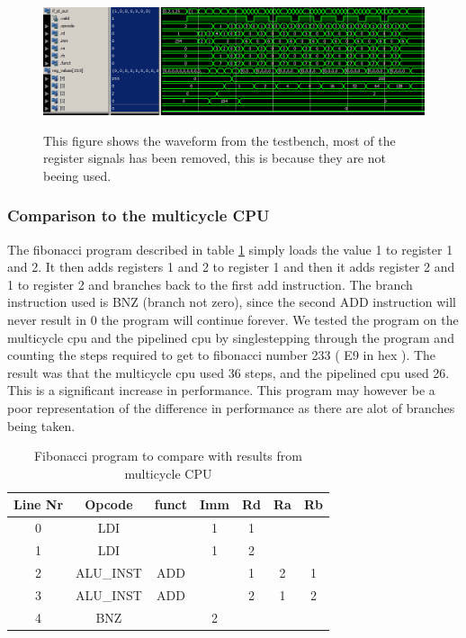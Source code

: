 \documentclass[11pt]{report}
\begin{document}
\begin{figure}
  \centering
  \includegraphics[width=.95\linewidth]{test3.png} \\
  \caption{This figure shows the waveform from the testbench, 
  most of the register signals has been removed, this is because they are not beeing used.}
  \label{fig:program3wave}
\end{figure}

\subsubsection*{Comparison to the multicycle CPU}

The fibonacci program described in table \ref{tab:fibonacci} simply loads the value 1
to register 1 and 2. It then adds registers 1 and 2 to register 1 and then it adds
register 2 and 1 to register 2 and branches back to the first add instruction. The 
branch instruction used is BNZ (branch not zero), since the second ADD instruction
will never result in 0 the program will continue forever. We tested the program on
the multicycle cpu and the pipelined cpu by singlestepping through the program and
counting the steps required to get to fibonacci number 233 ( E9 in hex ). The result
was that the multicycle cpu used 36 steps, and the pipelined cpu used 26. This is a
significant increase in performance. This program may however be a poor representation
of the difference in performance as there are alot of branches being taken.

\begin{table}[htbp]
  \centering
  \begin{tabular}{|c|c|c|c|c|c|c|}
    \hline
    Line Nr &	Opcode		&	funct	&	Imm	&	Rd	&	Ra	&	Rb	\\\hline
    	0	&	LDI			&			&	1	&	1	&		&		\\\hline
    	1	&	LDI			&			&	1	&	2	&		&		\\\hline
    	2	&	ALU\_INST	&	ADD		&		&	1	&	2	&	1	\\\hline
    	3	&	ALU\_INST	&	ADD		&		&	2	&	1	&	2	\\\hline
    	4	&	BNZ			&			&	2	&		&		&		\\\hline
  \end{tabular}
  \caption{Fibonacci program to compare with results from multicycle CPU}
  \label{tab:fibonacci}
\end{table}
\end{document}

